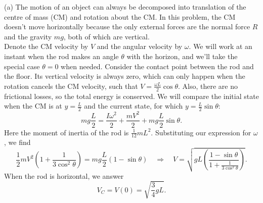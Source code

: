 \documentclass[../TST.tex]{subfiles}
\begin{document}
\ifprob \else
	\begin{solution} (a) The motion of an object can always be decomposed into translation of the centre of mass (CM) and rotation about the CM. In this problem, the CM doesn't move horizontally because the only external forces are the normal force $R$ and the gravity $mg$, both of which are vertical.\\[5pt]
		Denote the CM velocity by $V$ and the angular velocity by $\omega$. We will work at an instant when the rod makes an angle $\theta$ with the horizon, and we'll take the special case $\theta=0$ when needed. Consider the contact point between the rod and the floor. Its vertical velocity is always zero, which can only happen when the rotation cancels the CM velocity, such that $V=\frac{\omega L}{2}\cos{\theta}$. Also, there are no frictional losses, so the total energy is conserved. We will compare the initial state when the CM is at $y=\frac{L}{2}$ and the current state, for which $y=\frac{L}{2}\sin{\theta}$:
		\begin{equation*}
			mg\frac{L}{2}=\frac{I\omega^2}{2}+\frac{mV^2}{2}+mg \frac{L}{2}\sin{\theta}	
		.
		\end{equation*}
Here the moment of inertia of the rod is $\frac{1}{12}mL^2$. Substituting our expression for $\omega$, we find
\begin{equation*}
	\frac{1}{2}mV^2\left(1+\frac{1}{3\cos^2{\theta}}\right)=mg \frac{L}{2}(1-\sin{\theta}) \quad\Rightarrow\quad V=\sqrt{gL \left(\frac{1-\sin{\theta}}{1+\frac{1}{3\cos^2\theta}}\right)} .
\end{equation*}
When the rod is horizontal, we answer
\begin{equation*}
V_C=V(0)=\boxed{\sqrt{\frac{3}{4}gL}.}
\end{equation*}


\end{solution}
\end{document}
